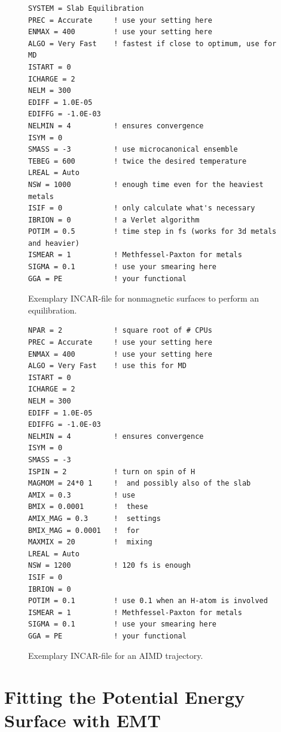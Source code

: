 \documentclass[twoside, 11pt, titlepage, captions=nooneline, a4paper, headsepline]{scrbook}%
\newcommand{\9}{\mathrm}
\newcommand{\0}{\,\mathrm}
\begin{document}
\begin{figure}
\begin{verbatim}
SYSTEM = Slab Equilibration
PREC = Accurate     ! use your setting here
ENMAX = 400         ! use your setting here
ALGO = Very Fast    ! fastest if close to optimum, use for MD
ISTART = 0
ICHARGE = 2
NELM = 300
EDIFF = 1.0E-05
EDIFFG = -1.0E-03
NELMIN = 4          ! ensures convergence
ISYM = 0
SMASS = -3          ! use microcanonical ensemble
TEBEG = 600         ! twice the desired temperature
LREAL = Auto
NSW = 1000          ! enough time even for the heaviest metals
ISIF = 0            ! only calculate what's necessary
IBRION = 0          ! a Verlet algorithm
POTIM = 0.5         ! time step in fs (works for 3d metals and heavier)
ISMEAR = 1          ! Methfessel-Paxton for metals
SIGMA = 0.1         ! use your smearing here
GGA = PE            ! your functional
\end{verbatim}
\caption{Exemplary INCAR-file for nonmagnetic surfaces to perform an equilibration.}
\label{figINCARSlabEqui}
\end{figure}

\begin{figure}
\begin{verbatim}
NPAR = 2            ! square root of # CPUs
PREC = Accurate     ! use your setting here
ENMAX = 400         ! use your setting here
ALGO = Very Fast    ! use this for MD
ISTART = 0
ICHARGE = 2
NELM = 300
EDIFF = 1.0E-05
EDIFFG = -1.0E-03
NELMIN = 4          ! ensures convergence
ISYM = 0
SMASS = -3
ISPIN = 2           ! turn on spin of H
MAGMOM = 24*0 1     !  and possibly also of the slab
AMIX = 0.3          ! use
BMIX = 0.0001       !  these
AMIX_MAG = 0.3      !  settings
BMIX_MAG = 0.0001   !  for
MAXMIX = 20         !  mixing
LREAL = Auto
NSW = 1200          ! 120 fs is enough
ISIF = 0
IBRION = 0
POTIM = 0.1         ! use 0.1 when an H-atom is involved
ISMEAR = 1          ! Methfessel-Paxton for metals
SIGMA = 0.1         ! use your smearing here
GGA = PE            ! your functional
\end{verbatim}
\caption{Exemplary INCAR-file for an AIMD trajectory.}
\label{figINCARTrajectory}
\end{figure}

\section{Fitting the Potential Energy Surface with EMT}
\end{document}
